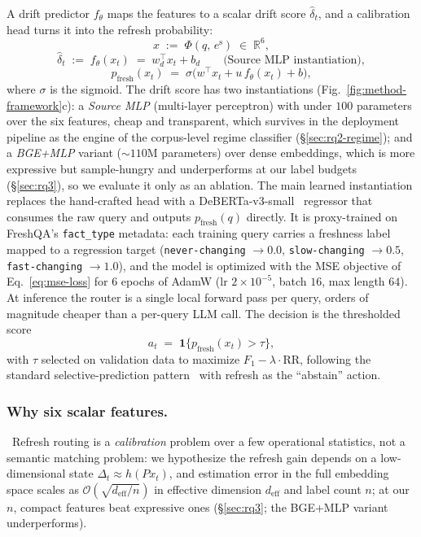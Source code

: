 \documentclass[pdflatex,sn-basic]{sn-jnl}
\providecommand{\mathbbm}[1]{\mathbf{#1}}
\begin{document}
A drift predictor $f_\theta$ maps the features to a scalar drift score $\hat\delta_t$, and a calibration head turns it into the refresh probability:
\begin{equation}
\label{eq:feature-map}
x \;:=\; \Phi(q,\,e^{\mathrm{s}}) \;\in\; \mathbb{R}^{6},
\end{equation}
\begin{equation}
\label{eq:drift-score}
\hat\delta_t \;:=\; f_\theta(x_t) \;=\; w_d^{\top} x_t + b_d \qquad \text{(Source MLP instantiation)},
\end{equation}
\begin{equation}
\label{eq:pfresh}
p_{\mathrm{fresh}}(x_t) \;=\; \sigma\!\big(w^\top x_t + u\, f_\theta(x_t) + b\big),
\end{equation}
where $\sigma$ is the sigmoid. The drift score has two instantiations (Fig.~\ref{fig:method-framework}c): a \emph{Source MLP} (multi-layer perceptron) with under $100$ parameters over the six features, cheap and transparent, which survives in the deployment pipeline as the engine of the corpus-level regime classifier (§\ref{sec:rq2-regime}); and a \emph{BGE+MLP} variant (${\sim}110$M parameters) over dense embeddings, which is more expressive but sample-hungry and underperforms at our label budgets (§\ref{sec:rq3}), so we evaluate it only as an ablation. The main learned instantiation replaces the hand-crafted head with a DeBERTa-v3-small~\cite{deberta2021} regressor that consumes the raw query and outputs $p_{\mathrm{fresh}}(q)$ directly. It is proxy-trained on FreshQA's \texttt{fact\_type} metadata: each training query carries a freshness label mapped to a regression target (\texttt{never-changing} $\to 0.0$, \texttt{slow-changing} $\to 0.5$, \texttt{fast-changing} $\to 1.0$), and the model is optimized with the MSE objective of Eq.~\eqref{eq:mse-loss} for $6$ epochs of AdamW (lr $2{\times}10^{-5}$, batch $16$, max length $64$). At inference the router is a single local forward pass per query, orders of magnitude cheaper than a per-query LLM call. The decision is the thresholded score
\begin{equation}
\label{eq:router}
a_t \;=\; \mathbbm{1}\{p_{\mathrm{fresh}}(x_t) > \tau\},
\end{equation}
with $\tau$ selected on validation data to maximize $F_1 - \lambda\cdot\mathrm{RR}$, following the standard selective-prediction pattern~\cite{geifman2017selective} with refresh as the ``abstain'' action.

\subsubsection*{Why six scalar features.}~Refresh routing is a \emph{calibration} problem over a few operational statistics, not a semantic matching problem: we hypothesize the refresh gain depends on a low-dimensional state $\Delta_t \approx h(Px_t)$, and estimation error in the full embedding space scales as $\mathcal{O}(\sqrt{d_{\mathrm{eff}}/n})$ in effective dimension $d_{\mathrm{eff}}$ and label count $n$; at our $n$, compact features beat expressive ones (§\ref{sec:rq3}; the BGE+MLP variant underperforms).
\end{document}
